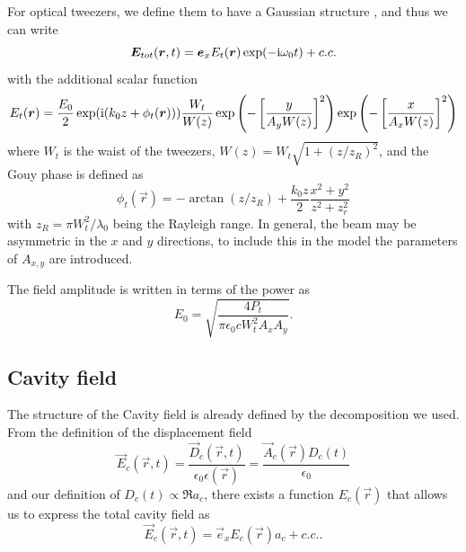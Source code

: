 For optical tweezers, we define them to have a Gaussian structure \cite{PhysRevE.49.5778},
    and thus we can write
\begin{equation}
\label{eq:sp:vEt}
    \bm{E}_{tot}(\bm{r}, t) = \bm{e}_xE_t(\bm{r}) \exp(-\mathrm{i}\omega_0 t) +c.c.
\end{equation}
with the additional scalar function
\begin{equation}
\label{eq:sp:Et}
    E_t(\bm{r}) = \frac{E_0}{2} \exp(\mathrm{i}(k_0z + \phi_t(\bm{r}))) \frac{W_t}{W(z)}
        \exp\left(-\left[ \frac{y}{A_y W(z)} \right]^2\right)
        \exp\left(-\left[ \frac{x}{A_x W(z)} \right]^2 \right)
\end{equation}
where $W_t$ is the waist of the tweezers,
    $W(z) = W_t \sqrt{1+(z/z_R)^2}$, 
    and the Gouy phase is defined as
\begin{equation}
    \phi_t(\vec r) = - \arctan{(z/z_R)} + \frac{k_0z}{2} \frac{x^2+y^2}{z^2+z_r^2}
\end{equation}
with $z_R = \pi W_t^2/\lambda_0$ being the Rayleigh range.
In general, the beam may be asymmetric in the $x$ and $y$ directions,
    to include this in the model the parameters of $A_{x,y}$ are introduced.

The field amplitude is written in terms of the power as 
\begin{equation}
\label{eq:sp:Et0}
    E_0 = \sqrt{\frac{4 P_t}{\pi \epsilon_0 c W_t^2 A_x A_y}}.
\end{equation} 

\subsection{Cavity field}
\label{ssec:sp:model:cavity}

The structure of the Cavity field is already defined by the decomposition we used.
From the definition of the displacement field
\begin{equation}
\label{eq:sp:vEc:prim}
    \vec E_c(\vec r, t) 
        = \frac{\vec D_c(\vec r, t)}{\epsilon_0\epsilon(\vec r)} 
        = \frac{\vec A_c(\vec r) D_c(t)}{\epsilon_0}
\end{equation}
    and our definition of $D_c(t) \propto \Re{a_c}$,
    there exists a function $E_c(\vec r)$
    that allows us to express the total cavity field as
\begin{equation}
\label{eq:sp:vEc}
    \vec E_c(\vec r, t) = \vec e_x E_c(\vec r) a_c + c.c. .
\end{equation}

